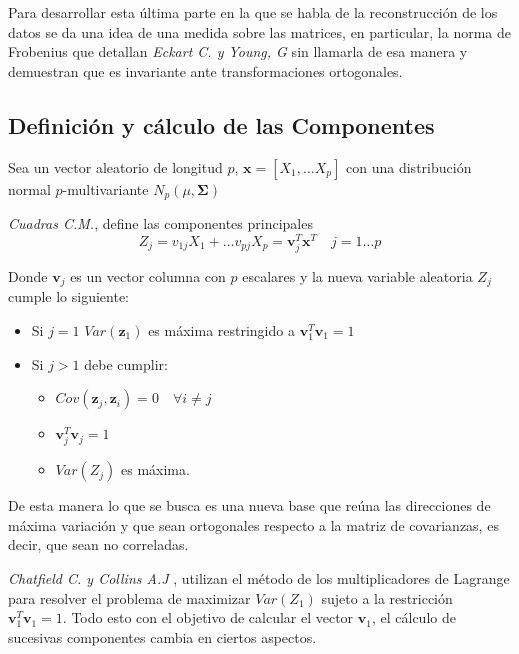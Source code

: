 \noindent Para desarrollar esta última parte en la que se habla de la reconstrucción de los datos se da una idea de una medida sobre las matrices, en particular, la norma de Frobenius que detallan \emph{Eckart C. y Young, G }\cite{Eckart 1936} sin llamarla de esa manera y demuestran que es invariante ante transformaciones ortogonales. 

\newpage
\subsection{Definición y cálculo de las Componentes}

\noindent Sea un vector aleatorio de longitud $p$, $\mathbf{x}=[X_1,\ldots X_p]$ con una distribución normal $p$-multivariante $N_p(\mu,\mathbf{\Sigma})$
\begin{defi}
\emph{Cuadras C.M.},\cite{Cuadras 2014} define las componentes principales 
\begin{equation}
Z_j=v_{1j}X_1+\ldots v_{pj}X_p=\mathbf{v}_j^T\mathbf{x}^T \quad j=1\ldots p
\end{equation}

\noindent Donde $\textbf{v}_j$ es un vector columna con $p$ escalares y la nueva variable aleatoria $Z_j$ cumple lo siguiente:
\begin{itemize}
\item Si $j=1$ $Var(\mathbf{z}_1)$ es máxima restringido a $\mathbf{v}_1^T \mathbf{v}_1=1$
\item Si $j>1$ debe cumplir:
\begin{itemize}
\item $Cov(\textbf{z}_j,\textbf{z}_i)=0\quad \forall i\neq j $
\item $\textbf{v}_j^T \textbf{v}_j=1$
\item $Var(Z_j)$ es máxima. 
\end{itemize}
\end{itemize}
\noindent De esta manera lo que se busca es una nueva base que reúna las direcciones de máxima variación y que sean ortogonales respecto a la matriz de covarianzas, es decir, que sean no correladas.
\end{defi}

\noindent \emph{Chatfield C. y Collins A.J} \cite{Chatfield 1989}, utilizan el método de los multiplicadores de Lagrange para resolver el problema de maximizar  $Var(Z_1)$ sujeto a la restricción $\textbf{v}_1^T\textbf{v}_1=1$. Todo esto con el objetivo de calcular el vector $\mathbf{v}_1$, el cálculo de sucesivas componentes cambia en ciertos aspectos. 

